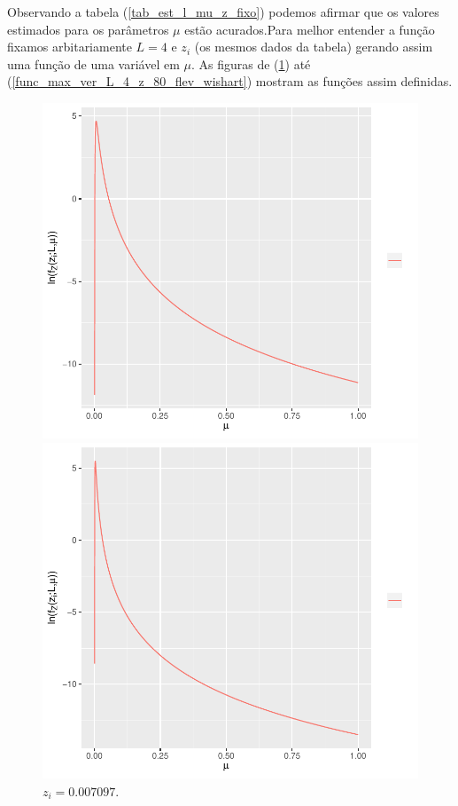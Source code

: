\documentclass[journal,article,submit,moreauthors,pdftex]{Definitions/mdpi}
\begin{document}
Observando a tabela (\ref{tab_est_l_mu_z_fixo}) podemos afirmar que os valores estimados para os parâmetros $\mu$ estão acurados.Para melhor entender a função fixamos arbitariamente $L=4$ e $z_i$ (os mesmos dados da tabela) gerando assim uma função de uma variável em $\mu$. As figuras de (\ref{func_max_ver_L_4_z_10_flev_wishart})  até (\ref{func_max_ver_L_4_z_80_flev_wishart}) mostram as funções assim definidas. 
\begin{figure}[hbt]
  \includegraphics[width=\linewidth]{func_max_ver_L_4_z_10_flev_wishart.pdf}
  	\caption{$z_i= 0.007097$.}\label{func_max_ver_L_4_z_10_flev_wishart}
\endminipage\hfill
{}
  \includegraphics[width=\linewidth]{func_max_ver_L_4_z_20_flev_wishart.pdf}

\end{figure}
\end{document}
